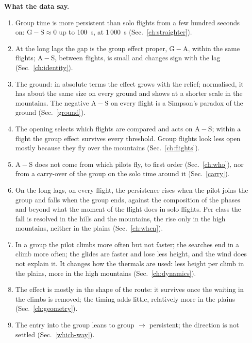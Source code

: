 \documentclass[10pt,a4paper]{article}
\newcommand{\G}{\mathrm{G}}
\newcommand{\A}{\mathrm{A}}
\newcommand{\Sl}{\mathrm{S}}
\newcommand{\Home}{\item[\textcolor{answer}{\textbf{Take home.}}]\color{black}}
\newenvironment{step}{\begin{description}[leftmargin=0pt, itemsep=7pt, topsep=8pt]}{\end{description}}
\begin{document}
\begin{step}
\Home \textbf{What the data say.}
  \begin{enumerate}
  \item Group time is more persistent than solo flights from a few hundred seconds on: $\G-\Sl\approx0$ up to
    100~s, \ChainGSThousand{} at 1\,000~s (Sec.~\ref{ch:straighter}).
  \item At the long lags the gap is the group effect proper, $\G-\A$, within the same flights; $\A-\Sl$, between
    flights, is small and changes sign with the lag (Sec.~\ref{ch:identity}).
  \item The ground: in absolute terms the effect grows with the relief; normalised, it has about the same size on
    every ground and shows at a shorter scale in the mountains. The negative $\A-\Sl$ on every flight is a Simpson's
    paradox of the ground (Sec.~\ref{ground}).
  \item The opening selects which flights are compared and acts on $\A-\Sl$; within a flight the group effect
    survives every threshold. Group flights look less open mostly because they fly over the mountains
    (Sec.~\ref{ch:flights}).
  \item $\A-\Sl$ does not come from which pilots fly, to first order (Sec.~\ref{ch:who}), nor from a carry-over of
    the group on the solo time around it (Sec.~\ref{carry}).
  \item On the long lags, on every flight, the persistence rises when the pilot joins the group and falls when the
    group ends, against the composition of the phases and beyond what the moment of the flight does in solo
    flights. Per class the fall is resolved in the hills and the mountains, the rise only in the high mountains,
    neither in the plains (Sec.~\ref{ch:when}).
  \item In a group the pilot climbs more often but not faster; the searches end in a climb more often; the glides
    are faster and lose less height, and the wind does not explain it. It changes how the thermals are used: less
    height per climb in the plains, more in the high mountains (Sec.~\ref{ch:dynamics}).
  \item The effect is mostly in the shape of the route: it survives once the waiting in the climbs is removed; the
    timing adds little, relatively more in the plains (Sec.~\ref{ch:geometry}).
  \item The entry into the group leans to group $\to$ persistent; the direction is not settled (Sec.~\ref{which-way}).
  \end{enumerate}

\end{step}
\end{document}
